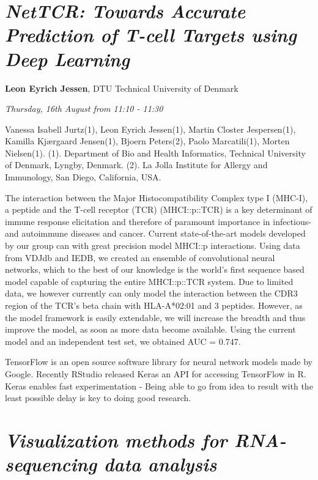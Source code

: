 \documentclass[]{book}
\theoremstyle{definition}
\theoremstyle{definition}
\theoremstyle{definition}
\theoremstyle{remark}
\begin{document}
\hypertarget{nettcr-towards-accurate-prediction-of-t-cell-targets-using-deep-learning}{%
\section{\texorpdfstring{\emph{NetTCR: Towards Accurate Prediction of
T-cell Targets using Deep
Learning}}{NetTCR: Towards Accurate Prediction of T-cell Targets using Deep Learning}}\label{nettcr-towards-accurate-prediction-of-t-cell-targets-using-deep-learning}}

\textbf{Leon Eyrich Jessen}, DTU Technical University of Denmark

\emph{Thursday, 16th August from 11:10 - 11:30}

Vanessa Isabell Jurtz(1), Leon Eyrich Jessen(1), Martin Closter
Jespersen(1), Kamilla Kjærgaard Jensen(1), Bjoern Peters(2), Paolo
Marcatili(1), Morten Nielsen(1). (1). Department of Bio and Health
Informatics, Technical University of Denmark, Lyngby, Denmark. (2). La
Jolla Institute for Allergy and Immunology, San Diego, California, USA.

The interaction between the Major Histocompatibility Complex type I
(MHC-I), a peptide and the T-cell receptor (TCR) (MHCI::p::TCR) is a key
determinant of immune response elicitation and therefore of paramount
importance in infectious- and autoimmune diseases and cancer. Current
state-of-the-art models developed by our group can with great precision
model MHCI::p interactions. Using data from VDJdb and IEDB, we created
an ensemble of convolutional neural networks, which to the best of our
knowledge is the world's first sequence based model capable of capturing
the entire MHCI::p::TCR system. Due to limited data, we however
currently can only model the interaction between the CDR3 region of the
TCR's beta chain with HLA-A*02:01 and 3 peptides. However, as the model
framework is easily extendable, we will increase the breadth and thus
improve the model, as soon as more data become available. Using the
current model and an independent test set, we obtained AUC = 0.747.

TensorFlow is an open source software library for neural network models
made by Google. Recently RStudio released Keras an API for accessing
TensorFlow in R. Keras enables fast experimentation - Being able to go
from idea to result with the least possible delay is key to doing good
research.

\hypertarget{visualization-methods-for-rna-sequencing-data-analysis}{%
\section{\texorpdfstring{\emph{Visualization methods for RNA-sequencing
data
analysis}}{Visualization methods for RNA-sequencing data analysis}}\label{visualization-methods-for-rna-sequencing-data-analysis}}
\end{document}
